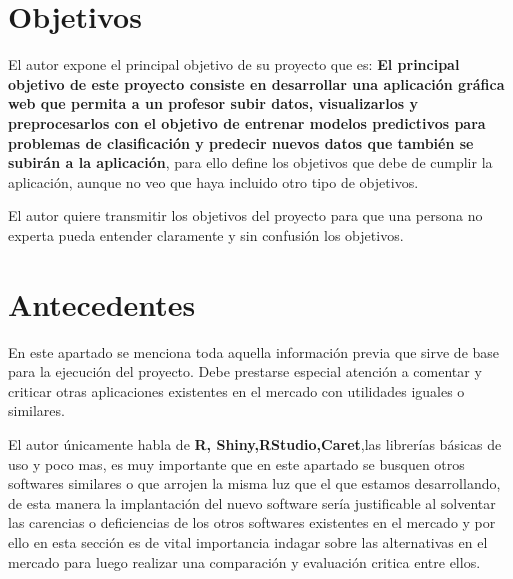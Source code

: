 \section{Objetivos}

El autor expone el principal objetivo de su proyecto que es: \textbf{El principal objetivo de este proyecto consiste en desarrollar una aplicación gráfica web que permita a un profesor subir datos, visualizarlos y preprocesarlos con el objetivo de entrenar modelos predictivos para problemas de clasificación y predecir nuevos datos que también se subirán a la aplicación}, para ello define los objetivos que debe de cumplir la aplicación, aunque no veo que haya incluido otro tipo de objetivos.

El autor quiere transmitir los objetivos del proyecto para
que una persona no experta pueda entender claramente y sin confusión los objetivos.

\hspace{15px}


\section{Antecedentes}

En este apartado se menciona toda aquella información previa que sirve de base para la ejecución del proyecto. Debe prestarse especial atención a comentar y criticar otras aplicaciones existentes en el mercado con utilidades iguales o similares.

El autor únicamente habla de \textbf{R, Shiny,RStudio,Caret},las librerías básicas de uso y poco mas, es muy importante que en este apartado se busquen otros softwares similares o que arrojen la misma luz que el que estamos desarrollando, de esta manera la implantación del nuevo software sería justificable al solventar las carencias o deficiencias de los otros softwares existentes en el mercado y por ello en esta sección es de vital importancia indagar sobre las alternativas en el mercado para luego realizar una comparación y evaluación critica entre ellos.

